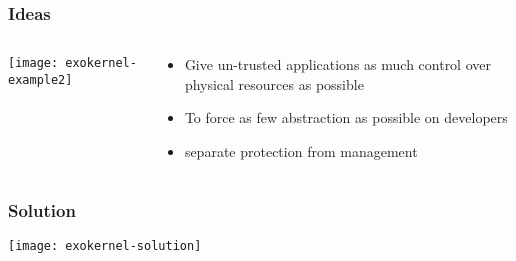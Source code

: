 \begin{frame}[plain]
	\frametitle{Ideas}
	
	
	
	\begin{columns}
		
		\begin{column}{.5\textwidth}
			
			\texttt{[image: exokernel-example2]}
			
		\end{column}
		
		\begin{column}{.5\textwidth}
			
			\begin{itemize}
				\item Give un-trusted applications as much control over physical resources as possible
				\item To force as few abstraction as possible on developers
				\item separate protection from management
				
			\end{itemize}	
		\end{column}
		
		
	\end{columns}
	
\end{frame}
\begin{frame}[plain]
	\frametitle{Solution}
	
	\centering
	\texttt{[image: exokernel-solution]}
	
\end{frame}



